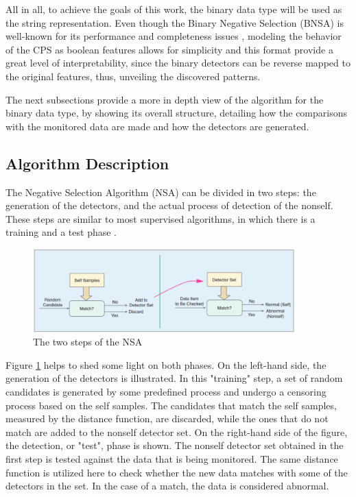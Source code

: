 All in all, to achieve the goals of this work, the binary data type will be used as the string representation. Even though the Binary Negative Selection (BNSA) is well-known for its performance and completeness issues \cite{NSADetGen1996}, modeling the behavior of the CPS as boolean features allows for simplicity and this format provide a great level of interpretability, since the binary detectors can be reverse mapped to the original features, thus, unveiling the discovered patterns.

The next subsections provide a more in depth view of the algorithm for the binary data type, by showing its overall structure, detailing how the comparisons with the monitored data are made and how the detectors are generated. 


\subsection{Algorithm Description} \label{sec:bgNSAOverview}

The Negative Selection Algorithm (NSA) can be divided in two steps: the generation of the detectors, and the actual process of detection of the nonself. These steps are similar to most supervised algorithms, in which there is a training and a test phase \cite{NSAResearch2021}. 

\begin{figure}[!h]
	\centering
	\includegraphics[width=0.9\textwidth, keepaspectratio]{img/NSA.png}
	\caption{The two steps of the NSA~ \cite{NSAResearch2021} }
	\label{fig:NSAOverview}
\end{figure}

Figure \ref{fig:NSAOverview} helps to shed some light on both phases. On the left-hand side, the generation of the detectors is illustrated. In this "training" step, a set of random candidates is generated by some predefined process and undergo a censoring process based on the self samples. The candidates that match the self samples, measured by the distance function, are discarded, while the ones that do not match are added to the nonself detector set. On the right-hand side of the figure, the detection, or "test", phase is shown. The nonself detector set obtained in the first step is tested against the data that is being monitored. The same distance function is utilized here to check whether the new data matches with some of the detectors in the set. In the case of a match, the data is considered abnormal.

